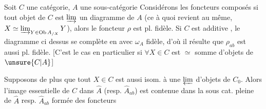 Soit $C$ une catégorie, $A$ une sous-catégorie
 Considérons les foncteurs composés
si  tout objet  de $C$ est
$\varinjlim$  un diagramme de $A$ (ce à
quoi revient au même, $X\simeq\varinjlim_{Y\in\operatorname{Ob}A_{/X}}Y$),
alors le foncteur $\rho$ est pl. fidèle.
Si $C$ est additive , le diagramme ci
dessus se complète en
avec $\omega_A$ fidèle, d'où il résulte
que $\rho_{ab}$ est aussi pl. fidèle.
[C'est le cas en particulier si $\forall X\in C$
est $\simeq$ somme d'objets de $\unsure{C|A}$]

Supposons de plus que tout
$X\in C$ est aussi isom. à une $\varprojlim$
 d'objets de $C_0$. Alors l'image essentielle
de $C$ dans $\widehat A$ (resp. $\widehat A_{ab}$)
est contenue dans la sous cat. pleine
de $\widehat A$ resp. $\widehat A_{ab}$ formée des foncteurs
